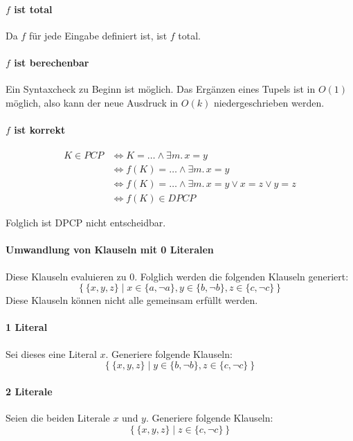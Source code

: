 \paragraph{$f$ ist total} Da $f$ für jede Eingabe definiert ist, ist $f$ total.
\par

\paragraph{$f$ ist berechenbar} Ein Syntaxcheck zu Beginn ist möglich. Das
Ergänzen eines Tupels ist in $O(1)$ möglich, also kann der neue Ausdruck in
$O(k)$ niedergeschrieben werden.
\par

\paragraph{$f$ ist korrekt}
\begin{align*}
	K \in PCP &\iff K = \ldots \land \exists m.\, x = y \\
		  &\iff f(K) = \ldots \land \exists m.\, x = y\\
		  &\iff f(K) = \ldots \land \exists m.\, x = y \lor x = z \lor y
		  = z \\
		  &\iff f(K) \in DPCP
\end{align*}

Folglich ist DPCP nicht entscheidbar.


\paragraph{Umwandlung von Klauseln mit 0 Literalen}
Diese Klauseln evaluieren zu $0$. Folglich werden die folgenden Klauseln
generiert:
\[
	\left\{\{x,y,z\} \mid x \in \{a,\lnot a\}, y \in \{b,\lnot b\}, z \in
	\{c,\lnot c\}\right\}
\]
Diese Klauseln können nicht alle gemeinsam erfüllt werden.
\par
\paragraph{1 Literal}
Sei dieses eine Literal $x$. Generiere folgende Klauseln:
\[
	\left\{\{x,y,z\} \mid y \in \{b,\lnot b\}, z \in
	\{c,\lnot c\}\right\}
\]
\par
\paragraph{2 Literale}
Seien die beiden Literale $x$ und $y$. Generiere folgende Klauseln:
\[
	\left\{\{x,y,z\} \mid z \in
	\{c,\lnot c\}\right\}
\]
\par

